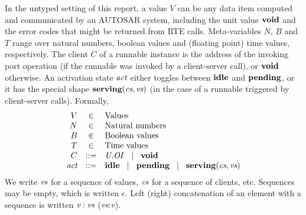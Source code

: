 \documentclass[twocolumn]{article}
\begin{document}
In the untyped setting of this report, a value $V$ can be any data item computed and communicated by an AUTOSAR system, including the unit value $\textbf{void}$ and the error codes that might be returned from RTE calls. Meta-variables $N$, $B$ and $T$ range over natural numbers, boolean values and (floating point) time values, respectively. The client $C$ of a runnable instance is the address of the invoking port operation (if the runnable was invoked by a client-server call), or $\textbf{void}$ otherwise. An activation state $\Act$ either toggles between $\textbf{idle}$ and $\textbf{pending}$, or it has the special shape $\serving{\Cs}{\Vs}$ (in the case of a runnable triggered by client-server calls). Formally,
$$
\begin{array}{rcll}
	V	& \in		& \text{Values} \\
	N	& \in		& \text{Natural numbers} \\
	B	& \in		& \text{Boolean values} \\
	T	& \in		& \text{Time values} \\
	C	& ::=		& \To{O}{U}{I} \sep \void \\
	\Act	& ::=		& \idle \sep \pending \sep \serving{\Cs}{\Vs} \\
\end{array}
$$
We write $\Vs$ for a sequence of values, $\Cs$ for a sequence of clients, etc. Sequences may be empty, which is written $\epsilon$. Left (right) concatenation of an element with a sequence is written $\Tcons{\V{V}}{\V{Vs}}$ ($\Tsnoc{\V{Vs}}{\V{V}}$).
\end{document}
